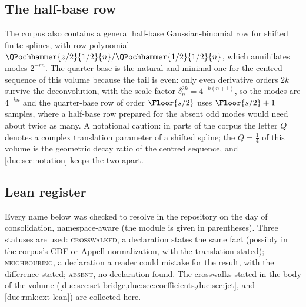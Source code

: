 \documentclass[11pt,oneside]{article}
\theoremstyle{plain}
\theoremstyle{definition}
\theoremstyle{remark}
\newcommand{\Qq}{Q}                                         %
\begin{document}
\subsection{The half-base row}
\label{due:sec:reg-half-base}

The corpus also contains a general half-base Gaussian-binomial row for
shifted finite splines, with row polynomial
$\QPochhammer{z/2}{1/2}{n}/\QPochhammer{1/2}{1/2}{n}$, which annihilates
modes $2^{-rn}$.  The quarter base is the natural and minimal one for the
centred sequence of this volume because the tail is even: only even
derivative orders $2k$ survive the deconvolution, with the scale factor
$\delta_{n}^{2k}=4^{-k(n+1)}$, so the modes are $4^{-kn}$ and the
quarter-base row of order $\Floor{s/2}$ uses $\Floor{s/2}+1$ samples, where
a half-base row prepared for the absent odd modes would need about twice as
many.  A notational caution: in parts of the corpus the letter $Q$ denotes
a complex translation parameter of a shifted spline; the $\Qq=\tfrac14$ of
this volume is the geometric decay ratio of the centred sequence, and
\cref{due:sec:notation} keeps the two apart.

\subsection{Lean register}
\label{due:sec:reg-lean}

Every name below was checked to resolve in the repository
\cite{proveit-primary} on the day of consolidation, namespace-aware
(the module is given in parentheses).  Three statuses are used:
\textsc{crosswalked}, a declaration states the same fact (possibly in the
corpus's CDF or Appell normalization, with the translation stated);
\textsc{neighbouring}, a declaration a reader could mistake for the
result, with the difference stated; \textsc{absent}, no declaration found.
The crosswalks stated in the body of the volume
(\cref{due:sec:set-bridge,due:sec:coefficients,due:sec:jet}, and
\cref{due:rmk:ext-lean}) are collected here.
\end{document}
